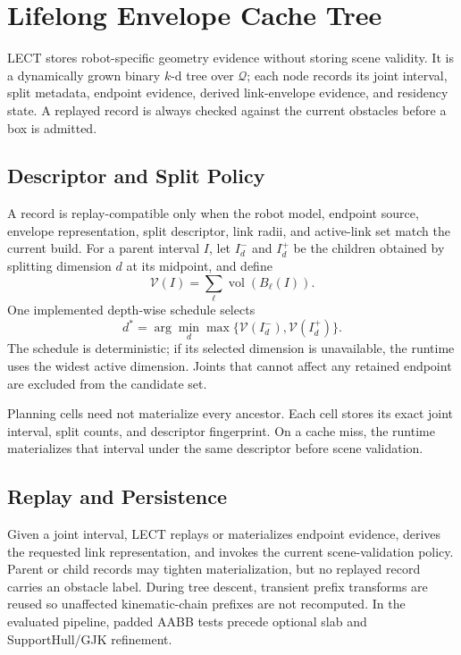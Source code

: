 \documentclass[journal]{IEEEtran}
\newcommand{\Q}{\ensuremath{\mathcal{Q}}}
\begin{document}
\section{Lifelong Envelope Cache Tree}\label{sec:lect}

LECT stores robot-specific geometry evidence without storing scene validity. It
is a dynamically grown binary $k$-d tree over $\Q$; each node records its joint
interval, split metadata, endpoint evidence, derived link-envelope evidence,
and residency state. A replayed record is always checked against the current
obstacles before a box is admitted.

\subsection{Descriptor and Split Policy}\label{sec:lect_design}

A record is replay-compatible only when the robot model, endpoint source,
envelope representation, split descriptor, link radii, and active-link set match
the current build. For a parent interval $I$, let $I_d^-$ and $I_d^+$ be the
children obtained by splitting dimension $d$ at its midpoint, and define
\[
\mathcal{V}(I)=\sum_\ell \operatorname{vol}(B_\ell(I)).
\]
One implemented depth-wise schedule selects
\[
d^*=\arg\min_d\max\{\mathcal{V}(I_d^-),\mathcal{V}(I_d^+)\}.
\]
The schedule is deterministic; if its selected dimension is unavailable, the
runtime uses the widest active dimension. Joints that cannot affect any retained
endpoint are excluded from the candidate set.

Planning cells need not materialize every ancestor. Each cell stores its exact
joint interval, split counts, and descriptor fingerprint. On a cache miss, the
runtime materializes that interval under the same descriptor before scene
validation.

\subsection{Replay and Persistence}\label{sec:lect_storage}

Given a joint interval, LECT replays or materializes endpoint evidence, derives
the requested link representation, and invokes the current scene-validation
policy. Parent or child records may tighten materialization, but no replayed
record carries an obstacle label. During tree descent, transient prefix
transforms are reused so unaffected kinematic-chain prefixes are not recomputed.
In the evaluated pipeline, padded AABB tests precede optional slab and
SupportHull/GJK refinement.
\end{document}
